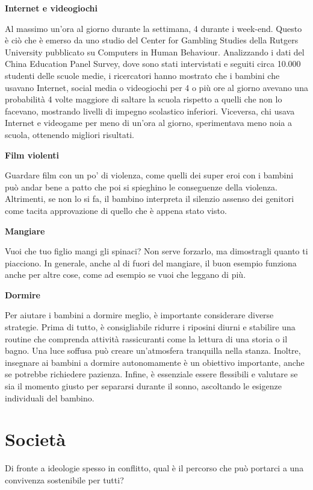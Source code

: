 \documentclass[12pt]{book} %
\begin{document}
\textbf{Internet e videogiochi}

Al massimo un'ora al giorno durante la settimana, 4 durante i week-end. Questo è ciò che è emerso da uno studio del
Center for Gambling Studies della Rutgers University pubblicato su Computers in Human Behaviour. Analizzando i dati del
China Education Panel Survey, dove sono stati intervistati e seguiti circa 10.000 studenti delle scuole medie, i
ricercatori hanno mostrato che i bambini che usavano Internet, social media o videogiochi per 4 o più ore al giorno
avevano una probabilità 4 volte maggiore di saltare la scuola rispetto a quelli che non lo facevano, mostrando livelli
di impegno scolastico inferiori. Viceversa, chi usava Internet e videogame per meno di un'ora al giorno, sperimentava
meno noia a scuola, ottenendo migliori risultati. 

\textbf{Film violenti}

Guardare film con un po' di violenza, come quelli dei super eroi con i bambini può andar bene a patto che poi si
spieghino le conseguenze della violenza. Altrimenti, se non lo si fa, il bambino interpreta il silenzio assenso dei
genitori come tacita approvazione di quello che è appena stato visto.

\textbf{Mangiare}

Vuoi che tuo figlio mangi gli spinaci? Non serve forzarlo, ma dimostragli quanto ti piacciono. In generale, anche al di
fuori del mangiare, il buon esempio funziona anche per altre cose, come ad esempio se vuoi che leggano di più.

\textbf{Dormire}

Per aiutare i bambini a dormire meglio, è importante considerare diverse strategie. Prima di tutto, è consigliabile
ridurre i riposini diurni e stabilire una routine che comprenda attività rassicuranti come la lettura di una storia o
il bagno. Una luce soffusa può creare un'atmosfera tranquilla nella stanza. Inoltre, insegnare ai bambini a dormire
autonomamente è un obiettivo importante, anche se potrebbe richiedere pazienza. Infine, è essenziale essere flessibili
e valutare se sia il momento giusto per separarsi durante il sonno, ascoltando le esigenze individuali del bambino.

\clearpage\section{Società}
Di fronte a ideologie spesso in conflitto, qual è il percorso che può portarci a una convivenza sostenibile per tutti?
\end{document}
